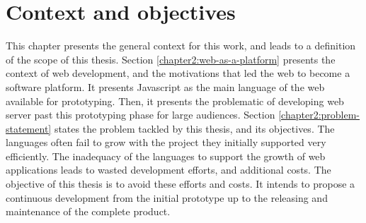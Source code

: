 \chapter{Context and objectives} \label{chapter2}
\minitoc
\eject

This chapter presents the general context for this work, and leads to a definition of the scope of this thesis.
Section \ref{chapter2:web-as-a-platform} presents the context of web development, and the motivations that led the web to become a software platform.
It presents Javascript as the main language of the web available for prototyping.
Then, it presents the problematic of developing web server past this prototyping phase for large audiences.
Section \ref{chapter2:problem-statement} states the problem tackled by this thesis, and its objectives.
The languages often fail to grow with the project they initially supported very efficiently.
The inadequacy of the languages to support the growth of web applications leads to wasted development efforts, and additional costs.
The objective of this thesis is to avoid these efforts and costs.
It intends to propose a continuous development from the initial prototype up to the releasing and maintenance of the complete product.


